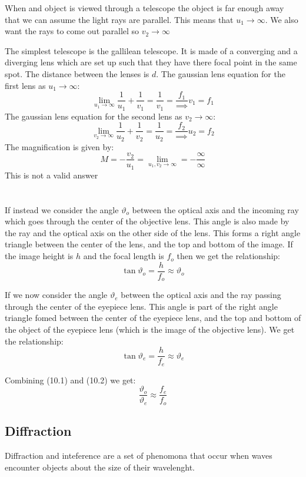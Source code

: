 \documentclass{article}
\begin{document}
When and object is viewed through a telescope the object is far enough away that we can assume the light rays are parallel. This means that \(u_1\to\infty\). We also want the rays to come out parallel so \(v_2\to\infty\)

The simplest telescope is the gallilean telescope. It is made of a converging and a diverging lens which are set up such that they have there focal point in the same spot. The distance between the lenses is \(d\).
The gaussian lens equation for the first lens as \(u_1\to\infty\):
\[\lim_{u_1\to\infty}\frac{1}{u_1}+\frac{1}{v_1}=\frac{1}{v_1}=\frac{f_1}\implies v_1=f_1\]
The gaussian lens equation for the second lens as \(v_2\to\infty\):
\[\lim_{v_2\to\infty}\frac{1}{u_2}+\frac{1}{v_2}=\frac{1}{u_2}=\frac{f_2}\implies u_2=f_2\]
The magnification is given by:
\[M=-\frac{v_2}{u_1}=\lim_{u_1,v_2\to\infty}=-\frac{\infty}{\infty}\]
This is not a valid answer \Sadey[1.25]


\section{}
If instead we consider the angle \(\vartheta_o\) between the optical axis and the incoming ray which goes through the center of the objective lens. This angle is also made by the ray and the optical axis on the other side of the lens. This forms a right angle triangle between the center of the lens, and the top and bottom of the image. If the image height is \(h\) and the focal length is \(f_o\) then we get the relationship:
\[\tan\vartheta_o=\frac{h}{f_o}\approx\vartheta_o\tag{10.1}\]

If we now consider the angle \(\vartheta_e\) between the optical axis and the ray passing through the center of the eyepiece lens. This angle is part of the right angle triangle fomed between the center of the eyepiece lens, and the top and bottom of the object of the eyepiece lens (which is the image of the objective lens). We get the relationship:
\[\tan\vartheta_e=\frac{h}{f_e}\approx\vartheta_e\tag{10.2}\]

Combining (10.1) and (10.2) we get:
\[\frac{\vartheta_o}{\vartheta_e}\approx\frac{f_e}{f_o}\]

\subsection*{Diffraction}

Diffraction and inteference are a set of phenomona that occur when waves encounter objects about the size of their wavelenght.
\end{document}
